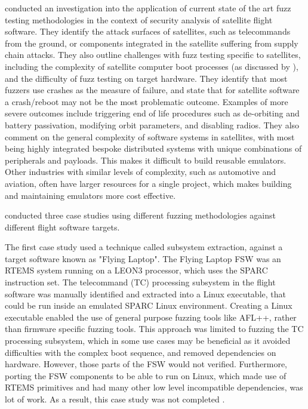 \documentclass[../report.tex]{subfiles}
\begin{document}
\citet{Willbold_2024} conducted an investigation into the application of
current state of the art fuzz testing methodologies in the context of security
analysis of satellite flight software. They identify the attack surfaces of
satellites, such as telecommands from the ground, or components integrated in
the satellite suffering from supply chain attacks. They also outline challenges
with fuzz testing specific to satellites, including the complexity of satellite
computer boot processes (as discussed by \citet{Scharnowski_2023}), and the
difficulty of fuzz testing on target hardware. They identify that most fuzzers use crashes as
the measure of failure, and state that for satellite software a crash/reboot
may not be the most problematic outcome. Examples of more severe outcomes
include triggering end of life procedures such as de-orbiting and battery
passivation, modifying orbit parameters, and disabling radios. They also
comment on the general complexity of software systems in satellites, with most
being highly integrated bespoke distributed systems with unique combinations of
peripherals and payloads. This makes it difficult to build reusable emulators.
Other industries with similar levels of complexity, such as automotive and
aviation, often have larger resources for a single project, which makes
building and maintaining emulators more cost effective.

\citet{Willbold_2024} conducted three case studies using different fuzzing
methodologies against different flight software targets.

The first case study used a technique called subsystem extraction, against a
target software known as "Flying Laptop". The Flying Laptop FSW was an RTEMS
system running on a LEON3 processor, which uses the SPARC instruction set. The
telecommand (TC) processing subsystem in the flight software was manually
identified and extracted into a Linux executable, that could be run inside an
emulated SPARC Linux environment. Creating a Linux executable enabled the use
of general purpose fuzzing tools like AFL++, rather than firmware specific
fuzzing tools. This approach was limited to fuzzing the TC processing
subsystem, which in some use cases may be beneficial as it avoided difficulties
with the complex boot sequence, and removed dependencies on hardware. However,
those parts of the FSW would not verified. Furthermore, porting the FSW
components to be able to run on Linux, which made use of RTEMS primitives and
had many other low level incompatible dependencies, was lot of work. As a
result, this case study was not completed \citep{Willbold_2024}.
\end{document}
